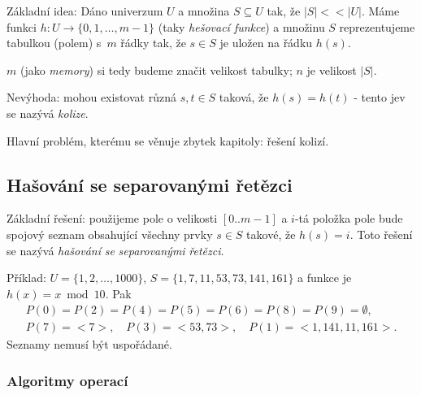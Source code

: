 \documentclass[a4paper,12pt]{article}
\begin{document}
Základní idea: Dáno univerzum $U$ a množina 
$S\subseteq U$ tak, že $|S|<<|U|$. Máme funkci 
$h:U\to \{0,1,\dots,m-1\}$ (taky \emph{hešovací funkce}) a množinu $S$ reprezentujeme 
tabulkou (polem) s~$m$ řádky tak, že $s\in S$ je uložen na 
řádku $h(s)$. 

$m$ (jako \emph{memory}) si tedy budeme značit velikost tabulky; $n$ je velikost $|S|$.

Nevýhoda: mohou existovat různá $s,t\in S$ taková, 
že $h(s)=h(t)$ - tento jev se nazývá \emph{kolize}.

Hlavní problém, kterému se věnuje zbytek kapitoly: řešení kolizí.

\subsection{Hašování se separovanými řetězci}
\label{sepretezce}

Základní řešení: použijeme pole o velikosti $[
0..m-1]$ a 
$i$-tá položka pole bude spojový seznam obsahující 
všechny prvky $s\in S$ takové, že $h(s)=i$. Toto řešení se 
nazývá \emph{hašování} \emph{se} \emph{separovanými} 
\emph{řetězci}.

Příklad: $U=\{1,2,\dots,1000\}$, $S=\{1,7,11,53,
73,141,161\}$ a 
funkce je $h(x)=x\bmod10$. Pak 
\begin{gather*} P(0)=P(2)=P(4)=P(5)=P(6)=P(8)=P(9)=\emptyset ,\\
P(7)=<7>,\quad P(3)=<53,73>,\quad P(1)=<1,141,11,161>.\end{gather*}
Seznamy nemusí být uspořádané.  

\subsubsection{Algoritmy operací}
\end{document}
